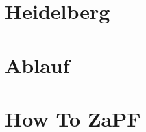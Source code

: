 \documentclass[ngerman,a5paper]{scrbook}
\begin{document}
\setcounter{tocdepth}{1} %
\tableofcontents



\chapter{Heidelberg}






\chapter{Ablauf}



\chapter{How To ZaPF}


\end{document}
